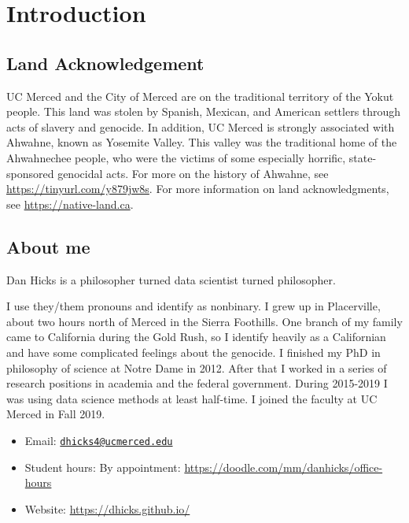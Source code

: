 \documentclass[
]{article}
\providecommand{\tightlist}{%
  \setlength{\itemsep}{0pt}\setlength{\parskip}{0pt}}
\begin{document}
\hypertarget{introduction}{%
\section{Introduction}\label{introduction}}

\hypertarget{land-acknowledgement}{%
\subsection{Land Acknowledgement}\label{land-acknowledgement}}

UC Merced and the City of Merced are on the traditional territory of the Yokut people. This land was stolen by Spanish, Mexican, and American settlers through acts of slavery and genocide. In addition, UC Merced is strongly associated with Ahwahne, known as Yosemite Valley. This valley was the traditional home of the Ahwahnechee people, who were the victims of some especially horrific, state-sponsored genocidal acts. For more on the history of Ahwahne, see \url{https://tinyurl.com/y879jw8s}. For more information on land acknowledgments, see \url{https://native-land.ca}.

\hypertarget{about-me}{%
\subsection{About me}\label{about-me}}

Dan Hicks is a philosopher turned data scientist turned philosopher.

I use they/them pronouns and identify as nonbinary. I grew up in Placerville, about two hours north of Merced in the Sierra Foothills. One branch of my family came to California during the Gold Rush, so I identify heavily as a Californian and have some complicated feelings about the genocide. I finished my PhD in philosophy of science at Notre Dame in 2012. After that I worked in a series of research positions in academia and the federal government. During 2015-2019 I was using data science methods at least half-time. I joined the faculty at UC Merced in Fall 2019.

\begin{itemize}
\tightlist
\item
  Email: \href{mailto:dhicks4@ucmerced.edu}{\nolinkurl{dhicks4@ucmerced.edu}}
\item
  Student hours: By appointment: \url{https://doodle.com/mm/danhicks/office-hours}
\item
  Website: \url{https://dhicks.github.io/}
\end{itemize}
\end{document}
